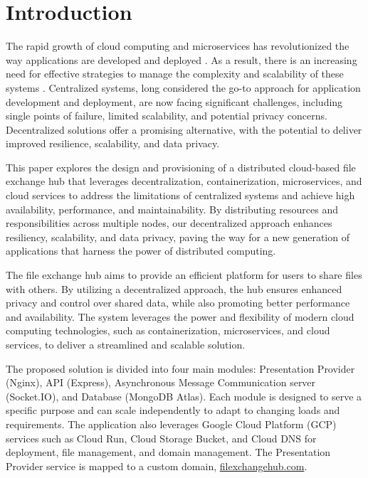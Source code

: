 \documentclass[a4paper,fleqn]{cas-dc}
\begin{document}
\maketitle

\section{Introduction}

The rapid growth of cloud computing and microservices has revolutionized the way applications are developed and deployed \cite{Selvakumar2023}. As a result, there is an increasing need for effective strategies to manage the complexity and scalability of these systems \cite{Correia2018}. Centralized systems, long considered the go-to approach for application development and deployment, are now facing significant challenges, including single points of failure, limited scalability, and potential privacy concerns. Decentralized solutions offer a promising alternative, with the potential to deliver improved resilience, scalability, and data privacy.

This paper explores the design and provisioning of a distributed cloud-based file exchange hub that leverages decentralization, containerization, microservices, and cloud services to address the limitations of centralized systems and achieve high availability, performance, and maintainability. By distributing resources and responsibilities across multiple nodes, our decentralized approach enhances resiliency, scalability, and data privacy, paving the way for a new generation of applications that harness the power of distributed computing.

The file exchange hub aims to provide an efficient platform for users to share files with others. By utilizing a decentralized approach, the hub ensures enhanced privacy and control over shared data, while also promoting better performance and availability. The system leverages the power and flexibility of modern cloud computing technologies, such as containerization, microservices, and cloud services, to deliver a streamlined and scalable solution.

The proposed solution is divided into four main modules: Presentation Provider (Nginx), API (Express), Asynchronous Message Communication server (Socket.IO), and Database (MongoDB Atlas). Each module is designed to serve a specific purpose and can scale independently to adapt to changing loads and requirements. The application also leverages Google Cloud Platform (GCP) services such as Cloud Run, Cloud Storage Bucket, and Cloud DNS for deployment, file management, and domain management. The Presentation Provider service is mapped to a custom domain, \url{filexchangehub.com}.
\end{document}
